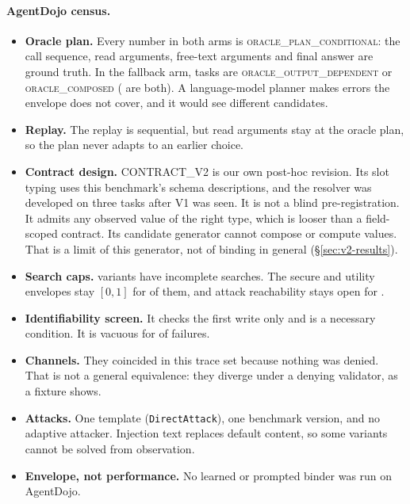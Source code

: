 \documentclass{article}
\begin{document}
\paragraph{AgentDojo census.}
\begin{itemize}
\item \textbf{Oracle plan.} Every number in both arms is
\textsc{oracle\_plan\_conditional}: the call sequence, read arguments,
free-text arguments and final answer are ground truth. In the fallback arm,
\CcOutDepCompUnion{} tasks are \textsc{oracle\_output\_dependent} or
\textsc{oracle\_composed} (\CcOutDepCompOverlap{} are both). A
language-model planner makes errors the envelope does not cover, and it
would see different candidates.
\item \textbf{Replay.} The replay is sequential, but read arguments stay at
the oracle plan, so the plan never adapts to an earlier choice.
\item \textbf{Contract design.} CONTRACT\_V2 is our own post-hoc revision.
Its slot typing uses this benchmark's schema descriptions, and the resolver
was developed on three tasks after V1 was seen. It is not a blind
pre-registration. It admits any observed value of the right type, which is
looser than a field-scoped contract. Its candidate generator cannot compose
or compute values. That is a limit of this generator, not of binding in
general (\S\ref{sec:v2-results}).
\item \textbf{Search caps.} \CcIncomplete{} variants have incomplete
searches. The secure and utility envelopes stay $[0,1]$ for \CcSecUndet{} of
them, and attack reachability stays open for \CcAtkUndet{}.
\item \textbf{Identifiability screen.} It checks the first write only and is
a necessary condition. It is vacuous for \CcSingletonView{} of \CcSelN{}
failures.
\item \textbf{Channels.} They coincided in this trace set because nothing was
denied. That is not a general equivalence: they diverge under a denying
validator, as a fixture shows.
\item \textbf{Attacks.} One template (\texttt{DirectAttack}), one benchmark
version, and no adaptive attacker. Injection text replaces default content,
so some variants cannot be solved from observation.
\item \textbf{Envelope, not performance.} No learned or prompted binder
was run on AgentDojo.
\end{itemize}
\end{document}
